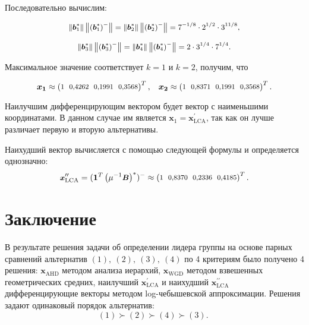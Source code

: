 \documentclass{math-mech-sci}
\begin{document}
Последовательно вычислим:
\vspace{-0.5ex}

$$
\small
\left\|\boldsymbol{b}_1^*\right\|\left\|\left(\boldsymbol{b}_1^*\right)^{-}\right\|= \left\|\boldsymbol{b}_2^*\right\|\left\|\left(\boldsymbol{b}_2^*\right)^{-}\right\|= 7^ {-1 / 8}\cdot 2^ {1 / 2}\cdot 3^ {11 / 8},
$$

$$
\small
\left\|\boldsymbol{b}_3^*\right\|\left\|\left(\boldsymbol{b}_3^*\right)^{-}\right\|= \left\|\boldsymbol{b}_4^*\right\|\left\|\left(\boldsymbol{b}_4^*\right)^{-}\right\|= 2\cdot 3^ {1 / 4}\cdot 7^ {1 / 4}.
$$
\vspace{-0.5ex}

Максимальное значение соответствует $k=1$ и $k=2$, получим, что 
\vspace{-0.5ex}

\[
\boldsymbol{x_1}\approx
\setlength{\arraycolsep}{3pt}
\footnotesize
\begin{pmatrix}
1 & 0{,} 4262 & 0{,} 1991 & 0{,} 3568
\end{pmatrix}^T,
\quad 
\normalsize
\boldsymbol{x_2}\approx
\setlength{\arraycolsep}{3pt}
\footnotesize
\begin{pmatrix}
1 & 0{,} 8371 & 0{,} 1991 & 0{,} 3568
\end{pmatrix}^T.
\]
\vspace{-0.7ex}

Наилучшим дифференцирующим вектором будет вектор с наименьшими координатами. В данном случае им является $\boldsymbol{x}_1=\boldsymbol{x}^{\prime}_{\mathrm{LCA}}$, так как он лучше различает первую и вторую альтернативы.
\vspace{0.7ex}

Наихудший вектор вычисляется с помощью следующей формулы и определяется однозначно:
$$
\small
\boldsymbol{x}^{\prime\prime}_{\mathrm{LCA}}=(\mathbf{1}^T\left(\mu^{-1} \boldsymbol{B}\right)^*)^-
\approx
\footnotesize
\setlength{\arraycolsep}{3pt}
\begin{pmatrix}
1 & 0{,} 8370 & 0{,} 2336 & 0{,} 4185
\end{pmatrix}^T.
$$


\section{Заключение}

В результате решения задачи об определении лидера группы на основе парных сравнений альтернатив $(1), \ (2),\ (3), \ (4)$ по 4 критериям было получено 4 решения: $\boldsymbol{x}_{\mathrm{AHD}}$ методом анализа иерархий, $\boldsymbol{x}_{\mathrm{WGD}}$ методом взвешенных геометрических средних, наилучший $\boldsymbol{x}^{\prime}_{\mathrm{LCA}}$ и наихудший $\boldsymbol{x}^{\prime\prime}_{\mathrm{LCA}}$ дифференцирующие векторы методом log-чебышевской аппроксимации. Решения задают одинаковый порядок альтернатив:
$$
(1) \succ(2) \succ(4) \succ(3) \text {. }
$$
\end{document}
